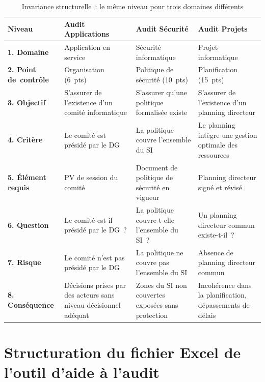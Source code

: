 \begin{table}[H]
\centering
\small
\caption{Invariance structurelle~: le même niveau pour trois domaines différents}
\label{tab:types-niveaux}
\begin{tabular}{p{2.6cm}p{3.5cm}p{3.5cm}p{3.5cm}}
\toprule
\textbf{Niveau} &
\textbf{Audit Applications} &
\textbf{Audit Sécurité} &
\textbf{Audit Projets} \\
\midrule
\textbf{1. Domaine} &
Application en service &
Sécurité informatique &
Projet informatique \\
\addlinespace
\textbf{2. Point de~contrôle} &
Organisation (6~pts) &
Politique de sécurité (10~pts) &
Planification (15~pts) \\
\addlinespace
\textbf{3. Objectif} &
S'assurer de l'existence d'un comité informatique &
S'assurer qu'une politique formalisée existe &
S'assurer de l'existence d'un planning directeur \\
\addlinespace
\textbf{4. Critère} &
Le comité est présidé par le DG &
La politique couvre l'ensemble du SI &
Le planning intègre une gestion optimale des ressources \\
\addlinespace
\textbf{5. Élément requis} &
PV de session du comité &
Document de politique de sécurité en vigueur &
Planning directeur signé et révisé \\
\addlinespace
\textbf{6. Question} &
Le comité est-il présidé par le DG~? &
La politique couvre-t-elle l'ensemble du SI~? &
Un planning directeur commun existe-t-il~? \\
\addlinespace
\textbf{7. Risque} &
Le comité n'est pas présidé par le DG &
La politique ne couvre pas l'ensemble du SI &
Absence de planning directeur commun \\
\addlinespace
\textbf{8. Conséquence} &
Décisions prises par des acteurs sans niveau décisionnel adéquat &
Zones du SI non couvertes exposées sans protection &
Incohérence dans la planification, dépassements de délais \\
\bottomrule
\end{tabular}
\end{table}

\section{Structuration du fichier Excel de l'outil d'aide à l'audit}
\label{sec:excel}

